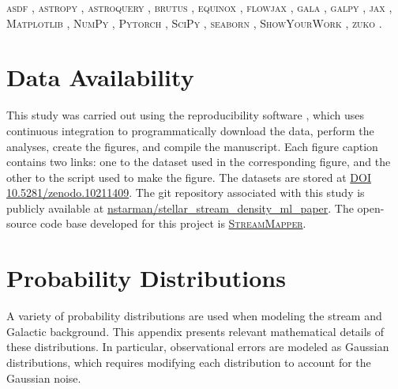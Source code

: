 \documentclass[twocolumn, linenumbers]{aastex631}
\newcommand{\code}[1]{\textsc{#1}}
\newcommand{\package}[1]{\code{#1}}
\begin{document}
        \package{asdf} \citep{Greenfield+2015}, %
        \package{astropy} \citep{Astropy2013, Astropy2018, Astropy2022}, %
        \package{astroquery} \citep{Astroquery2019}, %
        \package{brutus} \citep{brutus}, %
        \package{equinox} \citep{equinox}, %
        \package{flowjax} \citep{ward2023flowjax}, %
        \package{gala} \citep{gala}, %
        \package{galpy} \citep{galpy}, %
        \package{jax} \citep{jax2018github}, %
        \package{Matplotlib} \citep{Hunter2007}, %
        \package{NumPy} \citep{Harris+2020}, %
        \package{Pytorch} \citep{Pytorch2019}, %
        \package{SciPy} \citep{Scipy2020}, %
        \package{seaborn} \citep{seaborn}, %
        \package{ShowYourWork} \citep{Luger+2021}, %
        \package{zuko} \citep{zuko}. %

\newpage
\section*{Data Availability} \label{sec:data_availability}

    This study was carried out using the reproducibility software
    \href{https://github.com/showyourwork/showyourwork}{\showyourwork}
    \citep{Luger+2021}, which uses continuous integration to programmatically
    download the data, perform the analyses, create the figures, and compile the
    manuscript. Each figure caption contains two links: one to the dataset used
    in the corresponding figure, and the other to the script used to make the
    figure. The datasets are stored at
    \href{https://zenodo.org/doi/10.5281/zenodo.10903751}{DOI 10.5281/zenodo.10211409}. The git
    repository associated with this study is publicly available at
    \href{https://github.com/nstarman/stellar_stream_density_ml_paper}{nstarman/stellar\_stream\_density\_ml\_paper}.
    The open-source code base developed for this project is
    \href{https://github.com/GalOrrery/stream_mapper-pytorch}{\package{StreamMapper}}.



\newpage


\appendix

\section{Probability Distributions} \label{app:distributions}

    A variety of probability distributions are used when modeling the stream and
    Galactic background. This appendix presents relevant mathematical details of
    these distributions.  In particular, observational errors are modeled as
    Gaussian distributions, which requires modifying each distribution to
    account for the Gaussian noise.
\end{document}
